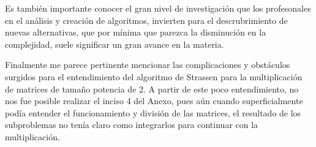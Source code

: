     Es también importante conocer el gran nivel de investigación que los profesonales en el análisis y creación de algoritmos, invierten para el descrubrimiento de nuevas alternativas, que por mínima que parezca la disminución en la complejidad, suele significar un gran avance en la materia.
    
    Finalmente me parece pertinente mencionar las complicaciones y obstáculos surgidos para el entendimiento del algoritmo de Strassen para la multiplicación de matrices de tamaño potencia de 2. A partir de este poco entendimiento, no nos fue posible realizar el inciso 4 del Anexo, pues aún cuando superficialmente podía entender el funcionamiento y división de las matrices, el resultado de los subproblemas no tenía claro como integrarlos para continuar con la multiplicación.